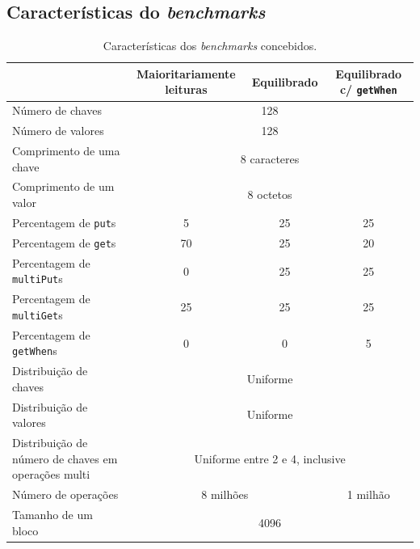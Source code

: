 \documentclass[11pt, a4paper]{article}
\begin{document}
\subsection{Características do \emph{benchmarks}}
\label{benckmark-description}

\begin{table}[H]
    \begin{center}
        \begin{tabular}{|p{5cm}|c|c|c|}
            \hline & Maioritariamente leituras & Equilibrado & Equilibrado c/ \texttt{getWhen} \\

            \hline Número de chaves         & \multicolumn{3}{c|}{128}          \\
            \hline Número de valores        & \multicolumn{3}{c|}{128}          \\
            \hline Comprimento de uma chave & \multicolumn{3}{c|}{8 caracteres} \\
            \hline Comprimento de um valor  & \multicolumn{3}{c|}{8 octetos}    \\

            \hline Percentagem de \texttt{put}s      & 5  & 25 & 25 \\
            \hline Percentagem de \texttt{get}s      & 70 & 25 & 20 \\
            \hline Percentagem de \texttt{multiPut}s & 0  & 25 & 25 \\
            \hline Percentagem de \texttt{multiGet}s & 25 & 25 & 25 \\
            \hline Percentagem de \texttt{getWhen}s  & 0  & 0  & 5  \\

            \hline Distribuição de chaves  & \multicolumn{3}{c|}{Uniforme} \\
            \hline Distribuição de valores & \multicolumn{3}{c|}{Uniforme} \\
            \hline Distribuição de número de chaves em operações multi &
                \multicolumn{3}{c|}{Uniforme entre 2 e 4, inclusive} \\

            \hline Número de operações & \multicolumn{2}{c|}{8 milhões} & 1 milhão\footnotemark \\
            \hline Tamanho de um bloco & \multicolumn{3}{c|}{4096} \\
            \hline
        \end{tabular}
    \end{center}

    \caption{Características dos \emph{benchmarks} concebidos.}
\end{table}
\end{document}
